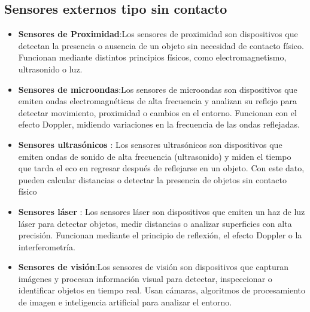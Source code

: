 \subsection{Sensores externos tipo sin contacto}
\begin{itemize}
	\item \textbf{Sensores de Proximidad}:Los sensores de proximidad son dispositivos que detectan la presencia o ausencia de un objeto sin necesidad de contacto físico. Funcionan mediante distintos principios físicos, como electromagnetismo, ultrasonido o luz.
	
	\item \textbf{Sensores de microondas}:Los sensores de microondas son dispositivos que emiten ondas electromagnéticas de alta frecuencia y analizan su reflejo para detectar movimiento, proximidad o cambios en el entorno. Funcionan con el efecto Doppler, midiendo variaciones en la frecuencia de las ondas reflejadas.
	
	\item \textbf{Sensores ultrasónicos }: Los sensores ultrasónicos son dispositivos que emiten ondas de sonido de alta frecuencia (ultrasonido) y miden el tiempo que tarda el eco en regresar después de reflejarse en un objeto. Con este dato, pueden calcular distancias o detectar la presencia de objetos sin contacto físico
	
	\item \textbf{Sensores láser }: Los sensores láser son dispositivos que emiten un haz de luz láser para detectar objetos, medir distancias o analizar superficies con alta precisión. Funcionan mediante el principio de reflexión, el efecto Doppler o la interferometría.

	\item \textbf{Sensores de visión}:Los sensores de visión son dispositivos que capturan imágenes y procesan información visual para detectar, inspeccionar o identificar objetos en tiempo real. Usan cámaras, algoritmos de procesamiento de imagen e inteligencia artificial para analizar el entorno.

\end{itemize}